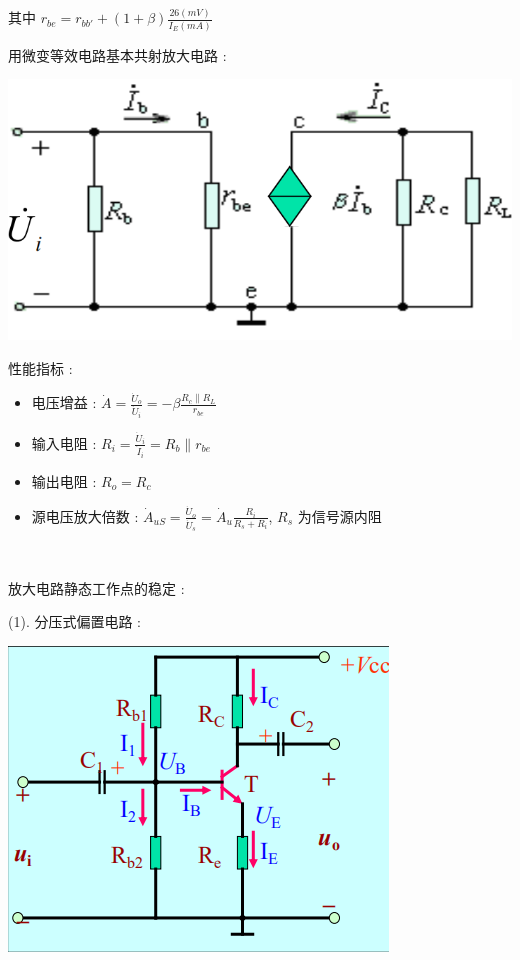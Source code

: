 \documentclass[UTF8, 12pt]{ctexart}
\begin{document}
	其中 $ r_{be} = r_{bb'} + (1+\beta)\frac{26(mV)}{I_{E}(mA)} $

	用微变等效电路基本共射放大电路 :

	\includegraphics[scale = 0.4]{02/基本共射放大电路微变等效电路.png}

	性能指标 :
	\begin{itemize}[leftmargin = 4em]
		\item 电压增益 : $ \dot{A} = \frac{\dot{U}_{o}}{\dot{U}_{i}} = -\beta\frac{R_{c} \parallel R_{L}}{r_{be}} $
		\item 输入电阻 : $ R_{i} = \frac{\dot{U}_{i}}{\dot{I}_{i}} = R_{b} \parallel r_{be} $
		\item 输出电阻 : $ R_{o} = R_{c} $
		\item 源电压放大倍数 : $ \dot{A}_{uS} = \frac{\dot{U}_{o}}{\dot{U}_{s}} = \dot{A}_{u}\frac{R_{i}}{R_{s}+R_{i}} $, $ R_{s} $ 为信号源内阻
	\end{itemize}

	~

	\noindent
	放大电路静态工作点的稳定 :

	(1). 分压式偏置电路 :

	\includegraphics[scale = 0.4]{02/分压式偏置电路.png}
\end{document}
